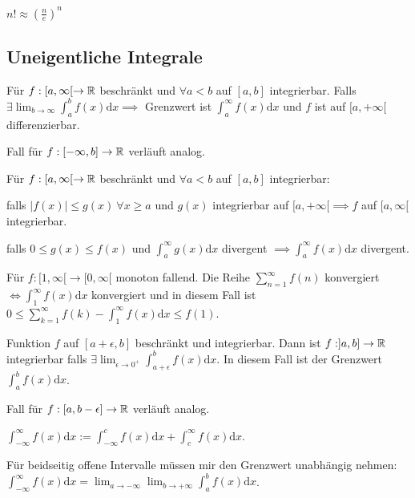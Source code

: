\begin{compactitem}
\item $n! \approx (\frac{n}{e})^n$
\end{compactitem}

\subsection{Uneigentliche Integrale}
\begin{compactitem}
    \item Für $f: [a, \infty[ \to \mathbb{R}$ beschränkt und $\forall a < b$ auf $[a,b]$ integrierbar. Falls $\exists \lim_{b \to \infty} \int_{a}^{b} f(x) \mathrm{d}x \implies$ Grenzwert ist $\int_{a}^{\infty} f(x) \mathrm{d}x$ und $f$ ist auf $[a, +\infty[$ differenzierbar.
    \begin{compactitem}
        \item Fall für $f:[-\infty, b] \to \mathbb{R}$ verläuft analog.
    \end{compactitem}
    \item Für $f:[a, \infty[ \to \mathbb{R}$ beschränkt und $\forall a < b$ auf $[a,b]$ integrierbar:
        \begin{compactitem}
            \item falls $|f(x)| \le g(x) \ \forall x \ge a$ und $g(x)$ integrierbar auf $[a, +\infty[ \implies f$ auf $[a, \infty[$ integrierbar.
            \item falls $0 \le g(x) \le f(x)$ und $\int_{a}^{\infty} g(x) \mathrm{d}x$ divergent $\implies \int_{a}^{\infty} f(x) \mathrm{d}x$ divergent.
        \end{compactitem}
    \item Für $f: [1, \infty[ \to [0, \infty[$ monoton fallend. Die Reihe $\sum_{n=1}^{\infty} f(n)$ konvergiert $\iff \int_{1}^{\infty} f(x) \mathrm{d}x$ konvergiert und in diesem Fall ist $0 \le \sum_{k=1}^{\infty} f(k) - \int_{1}^{\infty} f(x) \mathrm{d}x \le f(1)$.
    \item Funktion $f$ auf $[a + \epsilon, b]$ beschränkt und integrierbar. Dann ist $f:]a,b] \to \mathbb{R}$ integrierbar falls $\exists \lim_{\epsilon \to 0^+} \int_{a + \epsilon}^{b} f(x) \mathrm{d}x$. In diesem Fall ist der Grenzwert $\int_{a}^{b} f(x) \mathrm{d}x$.
    \begin{compactitem}
        \item Fall für $f:[a, b - \epsilon] \to \mathbb{R}$ verläuft analog.
    \end{compactitem}
    \item $\int_{-\infty}^{\infty} f(x) \mathrm{d}x := \int_{-\infty}^{c} f(x) \mathrm{d}x + \int_{c}^{\infty} f(x) \mathrm{d}x$.
    \item Für beidseitig offene Intervalle müssen mir den Grenzwert unabhängig nehmen: $\int_{-\infty}^{\infty} f(x) \mathrm{d}x = \lim_{a \to -\infty} \lim_{b \to +\infty} \int_{a}^{b} f(x) \mathrm{d}x$.
\end{compactitem}

